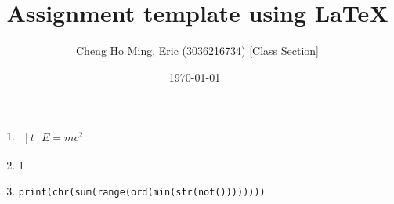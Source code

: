 \documentclass{article}
\title{Assignment template using LaTeX}
\author{Cheng Ho Ming, Eric (3036216734) [Class Section]}
\date{\today \ \currenttime}
\begin{document}
\maketitle

\begin{enumerate}[label=(\alph*)]
\item $\begin{aligned}[t]
E=mc^2
\end{aligned}$

\item 1
\item
    \begin{verbatim}
print(chr(sum(range(ord(min(str(not())))))))
    \end{verbatim}
\end{enumerate}
\end{document}
